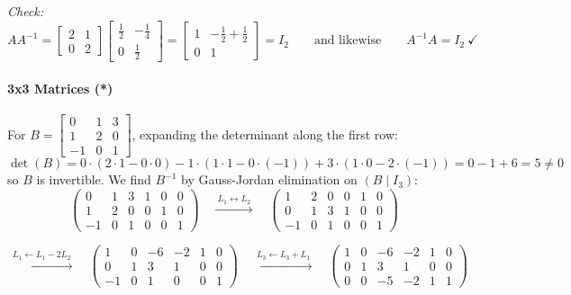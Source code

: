 \documentclass[]{article}
\begin{document}
	\textit{Check:}
	$$A A^{-1} = \begin{bmatrix} 2 & 1 \\ 0 & 2 \end{bmatrix} \begin{bmatrix} \frac{1}{2} & -\frac{1}{4} \\ 0 & \frac{1}{2} \end{bmatrix} = \begin{bmatrix} 1 & -\frac{1}{2} + \frac{1}{2} \\ 0 & 1 \end{bmatrix} = I_2
	\qquad \text{and likewise} \qquad A^{-1} A = I_2 \ \checkmark$$

	\paragraph{3x3 Matrices (*)}\mbox{}

	For $B = \begin{bmatrix} 0 & 1 & 3 \\ 1 & 2 & 0 \\ -1 & 0 & 1 \end{bmatrix}$, expanding the determinant along the first row:
	$$\det(B) = 0 \cdot (2 \cdot 1 - 0 \cdot 0) - 1 \cdot (1 \cdot 1 - 0 \cdot (-1)) + 3 \cdot (1 \cdot 0 - 2 \cdot (-1)) = 0 - 1 + 6 = 5 \neq 0$$
	so $B$ is invertible. We find $B^{-1}$ by Gauss-Jordan elimination on $\left(B \mid I_3\right)$:
	$$\left(\begin{array}{ccc|ccc}
		0 & 1 & 3 & 1 & 0 & 0\\
		1 & 2 & 0 & 0 & 1 & 0\\
		-1 & 0 & 1 & 0 & 0 & 1
	\end{array}\right)
	\quad \xrightarrow{\ L_1 \leftrightarrow L_2 \ }\quad
	\left(\begin{array}{ccc|ccc}
		1 & 2 & 0 & 0 & 1 & 0\\
		0 & 1 & 3 & 1 & 0 & 0\\
		-1 & 0 & 1 & 0 & 0 & 1
	\end{array}\right)$$

	$$\xrightarrow{\ L_1 \leftarrow L_1 - 2L_2 \ }\quad
	\left(\begin{array}{ccc|ccc}
		1 & 0 & -6 & -2 & 1 & 0\\
		0 & 1 & 3 & 1 & 0 & 0\\
		-1 & 0 & 1 & 0 & 0 & 1
	\end{array}\right)
	\quad \xrightarrow{\ L_3 \leftarrow L_3 + L_1 \ }\quad
	\left(\begin{array}{ccc|ccc}
		1 & 0 & -6 & -2 & 1 & 0\\
		0 & 1 & 3 & 1 & 0 & 0\\
		0 & 0 & -5 & -2 & 1 & 1
	\end{array}\right)$$
\end{document}
